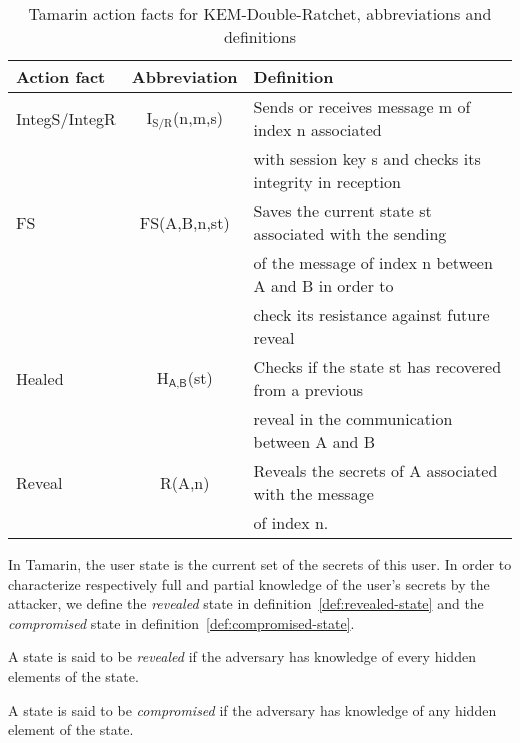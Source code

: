 \begin{table}[!ht]
    \centering
        \caption{Tamarin action facts for KEM-Double-Ratchet, abbreviations and de\-fi\-ni\-tions}
    \begin{tabular}{|l|c|l|}
    \hline
        Action fact & Abbreviation & Definition \\
        \hline
        \hline
        IntegS/IntegR & I$_{\text{S/R}}$(n,m,s) & Sends or receives message m of index n associated\\
        && with session key s and checks its integrity in reception\\
                       \hline
        FS & FS(A,B,n,st)& Saves the current state st associated with the sending\\
        && of the message of index n between A and B in order to\\
        && check its resistance against future reveal \\
                       \hline
        Healed & H$_{\textsf{A,B}}$(st) & Checks if the state st has recovered from a previous\\
        &&reveal in the communication between A and B\\
                       \hline
        Reveal & R(A,n) & Reveals the secrets of A associated with the message\\
        && of index n.\\
        \hline
    \end{tabular}
    \label{tab:DRTam}
\end{table}

In Tamarin, the user state is the current set of the secrets of this user. In order to characterize respectively full and partial knowledge of the user's secrets by the attacker, we define the \emph{revealed} state in definition~\ref{def:revealed-state} and the \emph{compromised} state in definition~\ref{def:compromised-state}. 

\begin{definition}
\label{def:revealed-state}
A state is said to be \emph{revealed} if the adversary has knowledge of every hidden elements of the state. 
\end{definition}

\begin{definition}
\label{def:compromised-state}
A state is said to be \emph{compromised} if the adversary has knowledge of any hidden element of the state.
\end{definition}

